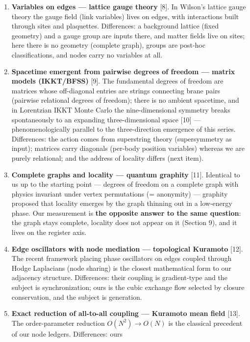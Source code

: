 \documentclass[
  a4paper,
]{article}
\providecommand{\tightlist}{%
  \setlength{\itemsep}{0pt}\setlength{\parskip}{0pt}}
\begin{document}
\begin{enumerate}
\def\labelenumi{\arabic{enumi}.}
\tightlist
\item
  \textbf{Variables on edges --- lattice gauge theory} {[}8{]}. In
  Wilson's lattice gauge theory the gauge field (link variables) lives
  on edges, with interactions built through sites and plaquettes.
  Differences: a background lattice (fixed geometry) and a gauge group
  are inputs there, and matter fields live on sites; here there is no
  geometry (complete graph), groups are post-hoc classifications, and
  nodes carry no variables at all.
\item
  \textbf{Spacetime emergent from pairwise degrees of freedom --- matrix
  models (IKKT/BFSS)} {[}9{]}. The fundamental degrees of freedom are
  matrices whose off-diagonal entries are strings connecting brane pairs
  (pairwise relational degrees of freedom); there is no ambient
  spacetime, and in Lorentzian IKKT Monte Carlo the nine-dimensional
  symmetry breaks spontaneously to an expanding three-dimensional space
  {[}10{]} --- phenomenologically parallel to the three-direction
  emergence of this series. Differences: the action comes from
  superstring theory (supersymmetry as input); matrices carry diagonals
  (per-body position variables) whereas we are purely relational; and
  the address of locality differs (next item).
\item
  \textbf{Complete graphs and locality --- quantum graphity} {[}11{]}.
  Identical to us up to the starting point --- degrees of freedom on a
  complete graph with physics invariant under vertex permutations (=
  anonymity) --- graphity proposed that locality emerges by the graph
  thinning out in a low-energy phase. Our measurement is \textbf{the
  opposite answer to the same question}: the graph stays complete,
  locality does not appear on it (Section 9), and it lives on the
  register axis.
\item
  \textbf{Edge oscillators with node mediation --- topological Kuramoto}
  {[}12{]}. The recent framework placing phase oscillators on edges
  coupled through Hodge Laplacians (node sharing) is the closest
  mathematical form to our adjacency structure. Differences: their
  coupling is gradient-type and the subject is synchronization; ours is
  the cubic exchange flow selected by closure conservation, and the
  subject is generation.
\item
  \textbf{Exact reduction of all-to-all coupling --- Kuramoto mean
  field} {[}13{]}. The order-parameter reduction \(O(N^2)\to O(N)\) is
  the classical precedent of our node ledgers. Differences: ours

\end{enumerate}
\end{document}
